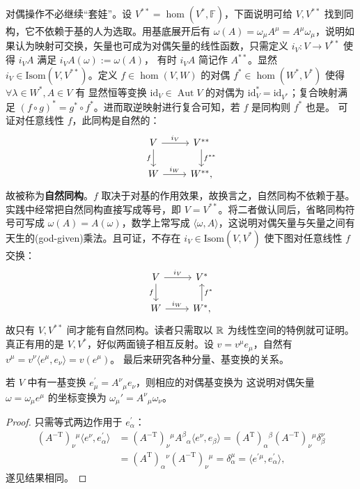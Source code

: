 对偶操作不必继续“套娃”。设 $V^{**}=\hom(V^*,\mathbb F)$，下面说明可给 $V,V^{**}$ 找到同构，它不依赖于基的人为选取。用基底展开后有 $\omega(A)=\omega_\mu A^\mu=A^\mu\omega_\mu$，说明如果认为映射可交换，矢量也可成为对偶矢量的线性函数，只需定义 $i_V:V\to V^{**}$ 使得 $i_V A$ 满足 $i_V A(\omega):=\omega(A)$，
有时 $i_V A$ 简记作 $A^{**}$。显然 $i_V\in\mathrm{Isom}(V,V^{**})$。定义 $f\in\hom(V,W)$ 的对偶 $f^*\in\hom(W^*, V^*)$ 使得 $\forall\lambda\in W^*,A\in V$ 有
显然恒等变换 $\mathrm{id}_V\in \operatorname{Aut} V$ 的对偶为 $\mathrm{id}_V^*=\mathrm{id}_{V^*}$；复合映射满足 $(f\circ g)^*=g^*\circ f^*$。进而取逆映射进行复合可知，若 $f$ 是同构则 $f^*$ 也是。
可证对任意线性 $f$，此同构是自然的：
\[\begin{tikzcd}
    V \arrow[r, "i_V"] \ar[d, "f"'] & V^{**} \arrow[d, "f^{**}"] \\
    W \arrow[r, "i_W"] & W^{**} ,
\end{tikzcd}\]
故被称为\textbf{自然同构}。$f$ 取决于对基的作用效果，故换言之，自然同构不依赖于基。实践中经常把自然同构直接写成等号，即 $V=V^{* *}$。将二者做认同后，省略同构符号可写成 $\omega(A)=A(\omega)$，数学上常写成 $\langle\omega,A\rangle$，这说明对偶矢量与矢量之间有天生的(god-given)乘法。且可证，不存在 $i_V\in\mathrm{Isom}(V,V^*)$ 使下图对任意线性 $f$ 交换：
\[\begin{tikzcd}
    V \arrow[r, "i_V"] \ar[d, "f"'] & V^{*} \\
    W \arrow[r, "i_W"] & W^{*} \arrow[u, "f^{*}"'],
\end{tikzcd}\]
故只有 $V,V^{* *}$ 间才能有自然同构。读者只需取以 $\mathbb{R}$ 为线性空间的特例就可证明。真正有用的是 $V,V^*$，好似两面镜子相互反射。设 $v=v^\mu e_\mu$，自然有 $v^\mu=v^\nu \langle e^\mu,e_\nu\rangle=v(e^\mu)$。
最后来研究各种分量、基变换的关系。
\begin{theorem}
    若 $V$ 中有一基变换 $e_\mu^{\prime}=A^\nu{ }_\mu e_\nu$，则相应的对偶基变换为
这说明对偶矢量 $\omega=\omega_\mu e^\mu$ 的坐标变换为 $\omega_\mu'=A^\nu{}_\mu\omega_\nu$。
\end{theorem}

\begin{proof}
    只需等式两边作用于 $e_\alpha^{\prime}$：
    \begin{align*}({A}^{-\mathrm{T}})_\nu{}^\mu\langle e^{\nu}, e_\alpha^{\prime}\rangle & =(A^{-\mathrm{T}})_\nu{ }^\mu A^\beta{}_\alpha\langle e^{\nu}, e_\beta\rangle  =(A^\mathrm{T})_\alpha{ }^\beta (A^{-\mathrm{T}})_\nu{ }^\mu \delta_\beta^\nu\\ &=(A^\mathrm{T})_\alpha{ }^\nu (A^{-\mathrm{T}})_\nu{ }^\mu=\delta_\alpha^\mu=\langle e^{\prime \mu}, e_\alpha^{\prime}\rangle,\end{align*}
    遂见结果相同。
\end{proof}


